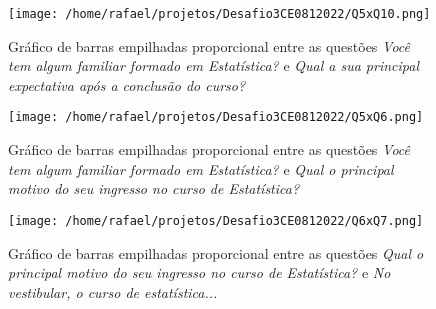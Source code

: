 \documentclass[
        a4paper,
        11pt,
        extrafontsizes,
        oneside,
        onecolumn,
        openright,
        final,
        article,
        brazil,
        sumario=tradicional
]{abntex2}
\begin{document}
\begin{figure}[htp]
\centering
\texttt{[image: /home/rafael/projetos/Desafio3CE0812022/Q5xQ10.png]}
\caption{Gráfico de barras empilhadas proporcional entre as questões \emph{Você tem algum 
familiar formado em Estatística?} e \emph{Qual a sua principal expectativa após a 
conclusão do curso?}}
\label{Q1xQ7}
\end{figure}

\begin{figure}[htp]
\centering
\texttt{[image: /home/rafael/projetos/Desafio3CE0812022/Q5xQ6.png]}
\caption{Gráfico de barras empilhadas proporcional entre as questões \emph{Você tem 
algum familiar formado em Estatística?} e \emph{Qual o principal motivo do seu ingresso 
no curso de Estatística?}}
\label{Q2xQ6}
\end{figure}

\begin{figure}[htp]
\centering
\texttt{[image: /home/rafael/projetos/Desafio3CE0812022/Q6xQ7.png]}
\caption{Gráfico de barras empilhadas proporcional entre as questões \emph{Qual o 
principal motivo do seu ingresso no curso de Estatística?} e \emph{No vestibular, 
o curso de estatística...}}
\label{Q6xQ7}
\end{figure}

\postextual
\end{document}
